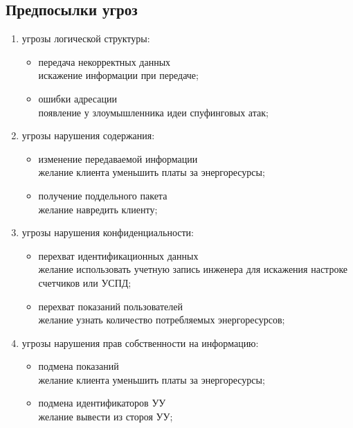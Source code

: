 \subsection{Предпосылки угроз}

\begin{enumerate}

 \item угрозы логической структуры:
 \begin{itemize}
  \item передача некорректных данных \\ искажение информации при передаче;
  \item ошибки адресации \\ появление у злоумышленника идеи спуфинговых атак;
 \end{itemize}
 
 \item угрозы нарушения содержания:
 \begin{itemize}
  \item изменение передаваемой информации \\ желание клиента уменьшить платы за энергоресурсы;
  \item получение поддельного пакета \\ желание навредить клиенту;
 \end{itemize}
 
 \item угрозы нарушения конфиденциальности:
 \begin{itemize}
  \item перехват идентификационных данных \\ желание использовать учетную запись инженера для искажения настроке счетчиков или УСПД;
  \item перехват показаний пользователей \\ желание узнать количество потребляемых энергоресурсов;
 \end{itemize}
 
 \item угрозы нарушения прав собственности на информацию:
 \begin{itemize}
  \item подмена показаний \\ желание клиента уменьшить платы за энергоресурсы;
  \item подмена идентификаторов УУ \\ желание вывести из стороя УУ;
 \end{itemize}
 
\end{enumerate}

